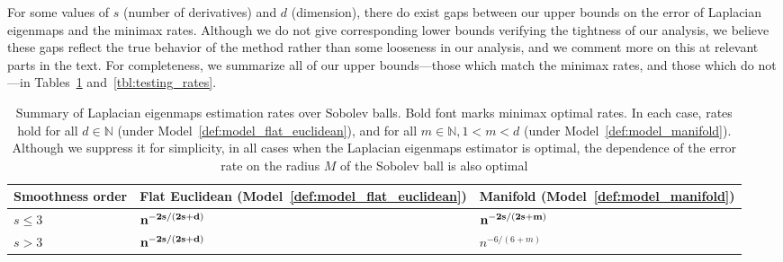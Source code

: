 For some values of $s$ (number of derivatives) and $d$ (dimension), there do exist gaps between our upper bounds on the error of Laplacian eigenmaps and the minimax rates. Although we do not give corresponding lower bounds verifying the tightness of our analysis, we believe these gaps reflect the true behavior of the method rather than some looseness in our analysis, and we comment more on this at relevant parts in the text. For completeness, we summarize all of our upper bounds---those which match the minimax rates, and those which do not---in Tables~\ref{tbl:estimation_rates} and~\ref{tbl:testing_rates}.
\begin{table}
	\begin{center}
		\begin{tabular}{p{} | p{} p{} }
			Smoothness order & Flat Euclidean (Model~\ref{def:model_flat_euclidean}) & Manifold (Model~\ref{def:model_manifold}) \\
			\hline
			$s \leq 3$ & ${\bf n^{-2s/(2s + d)}}$ & ${\bf n^{-2s/(2s + m)}}$ \\
			$s > 3$  & ${\bf n^{-2s/(2s + d)}}$ & $n^{-6/(6 + m)}$
		\end{tabular}
	\end{center}
	\caption{Summary of Laplacian eigenmaps estimation rates over Sobolev balls. Bold font marks minimax optimal rates. In each case, rates hold for all $d \in \mathbb{N}$ (under Model~\ref{def:model_flat_euclidean}), and for all $m \in \mathbb{N}, 1 < m < d$ (under Model~\ref{def:model_manifold}). Although we suppress it for simplicity, in all cases when the Laplacian eigenmaps estimator is optimal, the dependence of the error rate on the radius $M$ of the Sobolev ball is also optimal}
	\label{tbl:estimation_rates}
\end{table}

